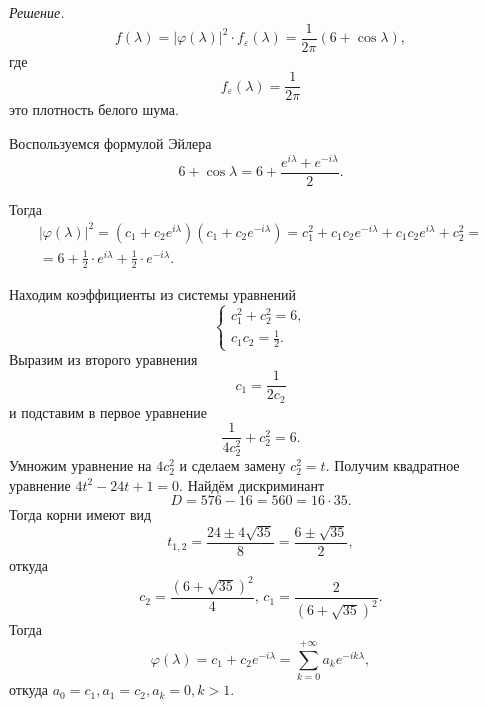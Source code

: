 \textit{Решение.}
\begin{equation*}
  f \left( \lambda \right) =
  \left| \varphi \left( \lambda \right) \right|^2 \cdot f_{ \varepsilon } \left( \lambda \right) =
  \frac{1}{2 \pi } \left( 6 + \cos \lambda \right),
\end{equation*}
где
\begin{equation*}
  f_{ \varepsilon } \left( \lambda \right) =
  \frac{1}{2 \pi }
\end{equation*}
это плотность белого шума.

Воспользуемся формулой Эйлера
\begin{equation*}
  6 + \cos \lambda =
  6 + \frac{e^{i \lambda } + e^{-i \lambda }}{2}.
\end{equation*}

Тогда
\begin{gather*}
  \left| \varphi \left( \lambda \right) \right|^2 =
  \left( c_1 + c_2 e^{i \lambda} \right) \left( c_1 + c_2 e^{-i \lambda } \right) =
  c_1^2 + c_1 c_2 e^{-i \lambda } + c_1 c_2 e^{i \lambda } + c_2^2 = \\
  = 6 + \frac{1}{2} \cdot e^{i \lambda } + \frac{1}{2} \cdot e^{-i \lambda }.
\end{gather*}

Находим коэффициенты из системы уравнений
\begin{equation*}
  \begin{cases}
    c_1^2 + c_2^2 = 6, \\
    c_1 c_2 = \frac{1}{2}.
  \end{cases}
\end{equation*}
Выразим из второго уравнения
\begin{equation*}
  c_1 =
  \frac{1}{2c_2}
\end{equation*}
и подставим в первое уравнение
\begin{equation*}
  \frac{1}{4c_2^2} + c_2^2 = 6.
\end{equation*}
Умножим уравнение на $4c_2^2$ и сделаем замену $c_2^2 = t$.
Получим квадратное уравнение $4t^2 - 24t + 1 = 0$.
Найдём дискриминант
\begin{equation*}
  D =
  576 - 16 = 560 = 16 \cdot 35.
\end{equation*}
Тогда корни имеют вид
\begin{equation*}
  t_{1, 2} =
  \frac{24 \pm 4 \sqrt{35}}{8} =
  \frac{6 \pm \sqrt{35}}{2},
\end{equation*}
откуда
\begin{equation*}
  c_2 = \frac{ \left( 6 + \sqrt{35} \right)^2}{4}, \,
  c_1 = \frac{2}{ \left( 6 + \sqrt{35} \right)^2}.
\end{equation*}
Тогда
\begin{equation*}
  \varphi \left( \lambda \right) =
  c_1 + c_2 e^{-i \lambda } =
  \sum \limits_{k = 0}^{+\infty } a_k e^{-ik \lambda },
\end{equation*}
откуда $a_0 = c_1, a_1 = c_2, a_k = 0, k > 1$.

